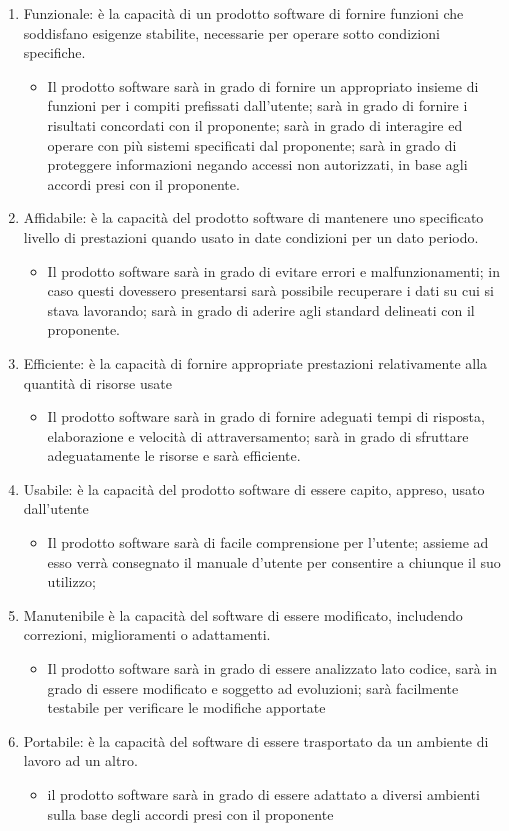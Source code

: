 \documentclass[../piano_di_qualifica.tex]{subfiles}
\begin{document}
\begin{enumerate}
\item Funzionale: è la capacità di un prodotto software di fornire funzioni che soddisfano esigenze stabilite, necessarie per operare sotto condizioni specifiche.
	\begin{itemize}
	\item Il prodotto software sarà in grado di fornire un appropriato insieme di funzioni per i compiti prefissati dall’utente; sarà in grado di fornire i risultati concordati con il proponente; sarà in grado di interagire ed operare con più sistemi specificati dal proponente; sarà in grado di proteggere informazioni negando accessi non autorizzati, in base agli accordi presi con il proponente.
	\end{itemize}
\item Affidabile: è la capacità del prodotto software di mantenere uno specificato livello di prestazioni quando usato in date condizioni per un dato periodo.
	\begin{itemize}
	\item Il prodotto software sarà in grado di evitare errori e malfunzionamenti; in caso questi dovessero presentarsi sarà possibile recuperare i dati su cui si stava lavorando; sarà in grado di aderire agli standard delineati con il proponente.
	\end{itemize}
\item Efficiente: è la capacità di fornire appropriate prestazioni relativamente alla quantità di risorse usate
	\begin{itemize}
	\item Il prodotto software sarà in grado di fornire adeguati tempi di risposta, elaborazione e velocità di attraversamento; sarà in grado di sfruttare adeguatamente le risorse e sarà efficiente.
	\end{itemize}
\item Usabile: è la capacità del prodotto software di essere capito, appreso, usato dall'utente
	\begin{itemize}
	\item Il prodotto software sarà di facile comprensione per l’utente; assieme ad esso verrà consegnato il manuale d’utente per consentire a chiunque il suo utilizzo; 
	\end{itemize}
\item Manutenibile è la capacità del software di essere modificato, includendo correzioni, miglioramenti o adattamenti.
	\begin{itemize}
	\item Il prodotto software sarà in grado di essere analizzato lato codice, sarà in grado di essere modificato e soggetto ad evoluzioni; sarà facilmente testabile per verificare le modifiche apportate
	\end{itemize}
\item Portabile: è la capacità del software di essere trasportato da un ambiente di lavoro ad un altro.
	\begin{itemize}
	\item il prodotto software sarà in grado di essere adattato a diversi ambienti sulla base degli accordi presi con il proponente
	\end{itemize}
\end{enumerate}
\end{document}
